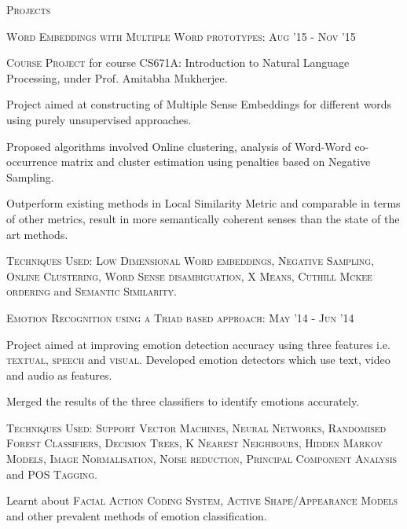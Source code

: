 \documentclass[10pt]{article}
\begin{document}
	\vspace{3mm}

	{\centering\Large{\textsc{Projects}} \hrulefill}
		
	\vspace{3mm}
	
	\large{\textsc{Word Embeddings with Multiple Word prototypes:}}   \hfill \small\textsc{Aug '15 - Nov '15}
	\begin{itemize}
	\small
	{
	\item \textsc{Course Project} for course CS671A: Introduction to Natural Language Processing, under Prof. Amitabha Mukherjee.
	\item Project aimed at constructing of Multiple Sense Embeddings for different words using purely unsupervised approaches.
	\item Proposed algorithms involved Online clustering, analysis of Word-Word co-occurrence matrix and cluster estimation using penalties based on Negative Sampling.
	\item Outperform existing methods in Local Similarity Metric and comparable in terms of other metrics, result in more semantically coherent senses than the state of the art methods.
	\item \textsc{Techniques Used:} \textsc{Low Dimensional Word embeddings, Negative Sampling, Online Clustering, Word Sense disambiguation, X Means, Cuthill Mckee ordering} and \textsc{Semantic Similarity}.
	}
	\end{itemize}
		
	\vspace{2mm}
	
	\large{\textsc{Emotion Recognition using a Triad based approach:}}   \hfill \small\textsc{May '14 - Jun '14}
	\begin{itemize}
	\small
	{
	\item Project aimed at improving emotion detection accuracy using three features i.e. \textsc{textual, speech} and \textsc{visual}. Developed emotion detectors which use text, video and audio as features.
	\item Merged the results of the three classifiers to identify emotions accurately.
	\item \textsc{Techniques Used:} \textsc{Support Vector Machines, Neural Networks, Randomised Forest Classifiers, Decision Trees, K Nearest Neighbours, Hidden Markov Models, Image Normalisation, Noise reduction, Principal Component Analysis} and \textsc{POS Tagging}.
	\item Learnt about \textsc{Facial Action Coding System,
Active Shape/Appearance Models} and other prevalent methods of emotion classification.
	}
	\end{itemize}
		
\end{document}
